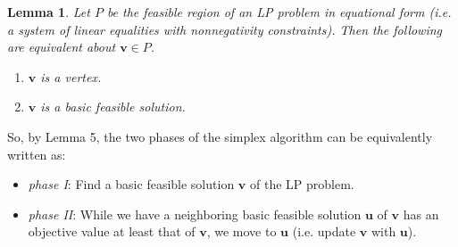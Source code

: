 \documentclass{article}
\newtheorem{lemma}[theorem]{Lemma}
\renewcommand{\vec}{\mathbf}
\begin{document}
\begin{lemma}
    Let $P$ be the feasible region of an LP problem in equational form (i.e. a system of linear equalities with nonnegativity constraints). Then the following are equivalent about $\vec{v}\in P$.
    \begin{enumerate}
        \item $\vec{v}$ is a vertex.
        \item $\vec{v}$ is a basic feasible solution.
    \end{enumerate}
\end{lemma}

So, by Lemma 5, the two phases of the simplex algorithm can be equivalently written as:
\begin{itemize}
    \item \textit{phase I}: Find a basic feasible solution $\vec{v}$ of the LP problem.
    \item \textit{phase II}: While we have a neighboring basic feasible solution $\vec{u}$ of $\vec{v}$ has an objective value at least that of $\vec{v}$, we move to $\vec{u}$ (i.e. update $\vec{v}$ with $\vec{u}$).
\end{itemize} 
\end{document}
